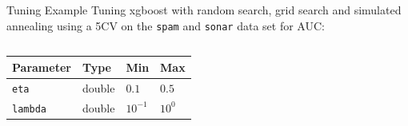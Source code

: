 \begin{frame}{Tuning Example}
Tuning xgboost with random search, grid search and simulated annealing using a 5CV on the \texttt{spam} and \texttt{sonar} data set for AUC:
\begin{columns}
\begin{column}{0.3\textwidth}
  \begin{center}
  \begin{tabular}{|l|l|l|l}
  Parameter&Type & Min & Max \\
  \hline
  \texttt{eta} & double & $0.1$ & $0.5$ \\
  \texttt{lambda}&  double & $10^{-1}$ & $10^{0}$ \\
  \end{tabular}
  \end{center}
\end{column}
\begin{column}{0.7\textwidth}
  \begin{center}
  \begin{figure}
  \end{figure}
  \end{center}
\end{column}
\end{columns}

\end{frame}



